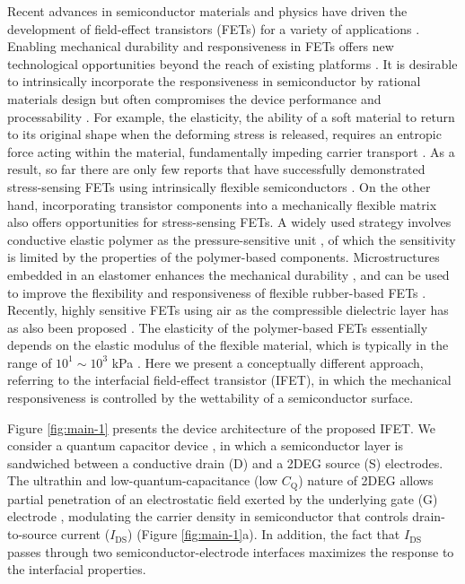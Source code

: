 

Recent advances in semiconductor materials and physics have
driven the development of field-effect transistors (FETs) for a
variety of applications \cite{Torsi_2013_rev,Ben_Sasson_2014}.  Enabling
mechanical durability and responsiveness in FETs offers new
technological opportunities beyond the reach of existing platforms
\cite{Someya_2004,Oh_2016,Shin_2017}. It is desirable to intrinsically
incorporate the responsiveness in semiconductor by rational materials
design \cite{Oh_2016} but often compromises the device performance and
processability \cite{Lee_2018}. For example, the elasticity, the ability
of a soft material to return to its original shape when the deforming
stress is released, requires an entropic force acting within the
material, fundamentally impeding carrier transport
\cite{OConnor_2011_strain_P3HT}. As a result, so far there are only few
reports that have successfully demonstrated stress-sensing FETs using
intrinsically flexible semiconductors \cite{Oh_2016}. On the other hand,
incorporating transistor components into a mechanically flexible
matrix also offers opportunities for stress-sensing FETs. A widely
used strategy involves conductive elastic polymer as the
pressure-sensitive unit
\cite{Someya_2004,Sekitani_2009,Kaltenbrunner_2013,Takei_2010}, of which
the sensitivity is limited by the properties of the polymer-based
components. Microstructures embedded in an elastomer enhances the
mechanical durability \cite{Jang_2015}, and can be used to improve the
flexibility and responsiveness of flexible rubber-based FETs
\cite{Mannsfeld_2010,Schwartz_2013}. Recently, highly sensitive FETs
using air as the compressible dielectric layer has as also been
proposed \cite{Zang_2015,Shin_2017}. The elasticity of the polymer-based
FETs essentially depends on the elastic modulus of the flexible
material, which is typically in the range of \(10^{1}\sim{}10^{3}\) kPa
\cite{Amjadi_2016}. Here we present a conceptually
different approach, referring to the interfacial field-effect
transistor (IFET), in which the mechanical responsiveness is
controlled by the wettability of a semiconductor surface.

Figure \ref{fig:main-1} presents the device architecture of the proposed
IFET. We consider a quantum capacitor device \cite{Luryi_1988}, in which
a semiconductor layer is sandwiched between a conductive drain (D) and
a 2DEG source (S) electrodes. The ultrathin and
low-quantum-capacitance (low \(C_{\mathrm{Q}}\)) nature of 2DEG allows
partial penetration of an electrostatic field exerted by the
underlying gate (G) electrode \cite{Shih2015Partially,Tian_2016},
modulating the carrier density in semiconductor that controls
drain-to-source current (\(I_{\mathrm{DS}}\)) (Figure
\ref{fig:main-1}a).  In addition, the fact that \(I_{\mathrm{DS}}\)
passes through two semiconductor-electrode interfaces maximizes the
response to the interfacial properties.


